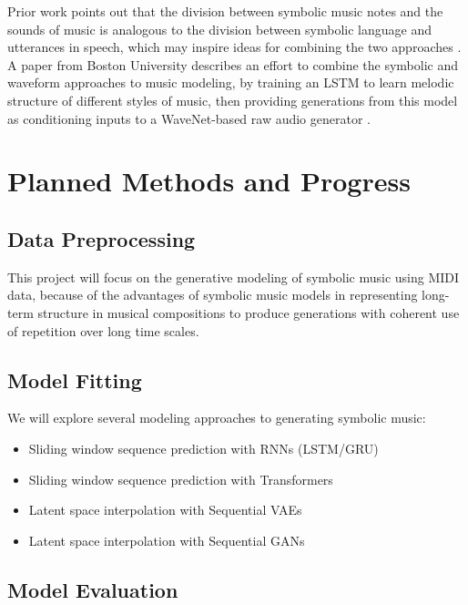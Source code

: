 \documentclass[sigconf,authorversion]{acmart}
\begin{document}
Prior work points out that the division between symbolic music notes and the
sounds of music is analogous to the division between symbolic language and
utterances in speech, which may inspire ideas for combining the two approaches
\cite{hawthorne2019enabling}. A paper from Boston University describes an effort
to combine the symbolic and waveform approaches to music modeling, by training
an LSTM to learn melodic structure of different styles of music, then providing
generations from this model as conditioning inputs to a WaveNet-based raw audio
generator \cite{manzelli_conditioning_2018}.

\section{Planned Methods and Progress}

\subsection{Data Preprocessing}

This project will focus on the generative modeling of symbolic music using MIDI
data, because of the advantages of symbolic music models in representing
long-term structure in musical compositions to produce generations with coherent
use of repetition over long time scales.

\subsection{Model Fitting}

We will explore several modeling approaches to generating symbolic music:

\begin{itemize}
  \item{Sliding window sequence prediction with RNNs (LSTM/GRU)}
  \item{Sliding window sequence prediction with Transformers}
  \item{Latent space interpolation with Sequential VAEs}
  \item{Latent space interpolation with Sequential GANs}
\end{itemize}

\subsection{Model Evaluation}
\end{document}
